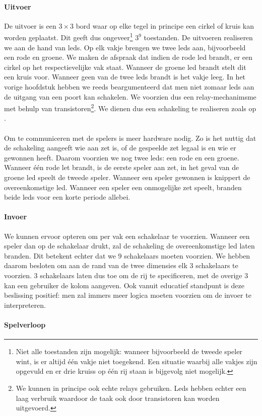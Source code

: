 \paragraph{Uitvoer}
De uitvoer is een $3\times 3$ bord waar op elke tegel in principe een cirkel of kruis kan worden geplaatst. Dit geeft dus ongeveer\footnote{Niet alle toestanden zijn mogelijk: wanneer bijvoorbeeld de tweede speler wint, is er altijd \'e\'en vakje niet toegekend. Een situatie waarbij alle vakjes zijn opgevuld en er drie kruiss op \'e\'en rij staan is bijgevolg niet mogelijk.} $3^9$ toestanden. De uitvoeren realiseren we aan de hand van leds. Op elk vakje brengen we twee leds aan, bijvoorbeeld een rode en groene. We maken de afspraak dat indien de rode led brandt, er een cirkel op het respectievelijke vak staat. Wanneer de groene led brandt stelt dit een kruis voor. Wanneer geen van de twee leds brandt is het vakje leeg. In het vorige hoofdstuk hebben we reeds beargumenteerd dat men niet zomaar leds aan de uitgang van een poort kan schakelen. We voorzien dus een relay-mechanimsme met behulp van transistoren\footnote{We kunnen in principe ook echte relays gebruiken. Leds hebben echter een laag verbruik waardoor de taak ook door transistoren kan worden uitgevoerd.}. We dienen dus een schakeling te realiseren zoals op .
\paragraph{}
Om te communiceren met de spelers is meer hardware nodig. Zo is het nuttig dat de schakeling aangeeft wie aan zet is, of de gespeelde zet legaal is en wie er gewonnen heeft. Daarom voorzien we nog twee leds: een rode en een groene. Wanneer \'e\'en rode let brandt, is de eerste speler aan zet, in het geval van de groene led speelt de tweede speler. Wanneer een speler gewonnen is knippert de overeenkomstige led. Wanneer een speler een onmogelijke zet speelt, branden beide leds voor een korte periode allebei.
\paragraph{Invoer}
We kunnen ervoor opteren om per vak een schakelaar te voorzien. Wanneer een speler dan op de schakelaar drukt, zal de schakeling de overeenkomstige led laten branden. Dit betekent echter dat we $9$ schakelaars moeten voorzien. We hebben daarom besloten om aan de rand van de twee dimensies elk $3$ schakelaars te voorzien. $3$ schakelaars laten dus toe om de rij te specificeren, met de overige $3$ kan een gebruiker de kolom aangeven. Ook vanuit educatief standpunt is deze beslissing positief: men zal immers meer logica moeten voorzien om de invoer te interpreteren.
\paragraph{Spelverloop}
